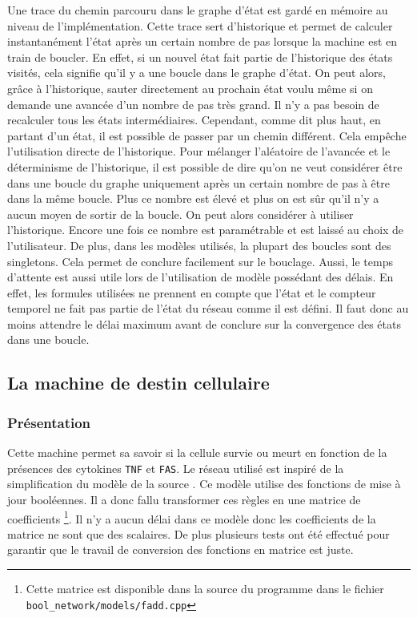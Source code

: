 \documentclass[11pt, a4paper]{article}
\begin{document}
Une trace du chemin parcouru dans le graphe d'état est gardé en mémoire au
niveau de l'implémentation. Cette trace sert d'historique et permet de calculer
instantanément l'état après un certain nombre de pas lorsque la machine est en
train de boucler. En effet, si un nouvel état fait partie de l'historique des
états visités, cela signifie qu'il y a une boucle dans le graphe d'état. On
peut alors, grâce à l'historique, sauter directement au prochain état voulu
même si on demande une avancée d'un nombre de pas très grand. Il n'y a pas
besoin de recalculer tous les états intermédiaires. Cependant, comme dit plus
haut, en partant d'un état, il est possible de passer par un chemin différent.
Cela empêche l'utilisation directe de l'historique. Pour mélanger l'aléatoire
de l'avancée et le déterminisme de l'historique, il est possible de dire qu'on
ne veut considérer être dans une boucle du graphe uniquement après un certain
nombre de pas à être dans la même boucle. Plus ce nombre est élevé et plus on
est sûr qu'il n'y a aucun moyen de sortir de la boucle. On peut alors
considérer à utiliser l'historique. Encore une fois ce nombre est paramétrable
et est laissé au choix de l'utilisateur. De plus, dans les modèles utilisés, la
plupart des boucles sont des singletons. Cela permet de conclure facilement sur
le bouclage. Aussi, le temps d'attente est aussi utile lors de l'utilisation de
modèle possédant des délais. En effet, les formules utilisées ne prennent en
compte que l'état et le compteur temporel ne fait pas partie de l'état du
réseau comme il est défini. Il faut donc au moins attendre le délai maximum
avant de conclure sur la convergence des états dans une boucle.

\subsection{La machine de destin cellulaire}
\subsubsection{Présentation}
Cette machine permet sa savoir si la cellule survie ou meurt en fonction de la
présences des cytokines \texttt{TNF} et \texttt{FAS}. Le réseau utilisé est
inspiré de la simplification du modèle de la source \cite{calzone2010}. Ce
modèle utilise des fonctions de mise à jour booléennes. Il a donc fallu
transformer ces règles en une matrice de coefficients \footnote{Cette matrice
est disponible dans la source du programme dans le fichier
\texttt{bool\_network/models/fadd.cpp}}. Il n'y a aucun délai dans ce modèle
donc les coefficients de la matrice ne sont que des scalaires. De plus
plusieurs tests ont été effectué pour garantir que le travail de conversion
des fonctions en matrice est juste.
\end{document}
